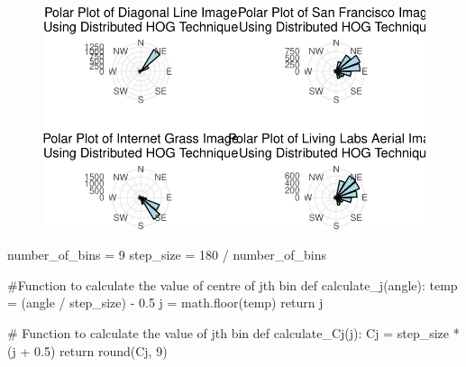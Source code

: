 \documentclass[
  letterpaper,
  DIV=11,
  numbers=noendperiod]{scrreprt}
\newenvironment{Shaded}{\begin{snugshade}}{\end{snugshade}}
\newcommand{\BuiltInTok}[1]{\textcolor[rgb]{0.00,0.23,0.31}{#1}}
\newcommand{\CommentTok}[1]{\textcolor[rgb]{0.37,0.37,0.37}{#1}}
\newcommand{\ControlFlowTok}[1]{\textcolor[rgb]{0.00,0.23,0.31}{#1}}
\newcommand{\DecValTok}[1]{\textcolor[rgb]{0.68,0.00,0.00}{#1}}
\newcommand{\FloatTok}[1]{\textcolor[rgb]{0.68,0.00,0.00}{#1}}
\newcommand{\KeywordTok}[1]{\textcolor[rgb]{0.00,0.23,0.31}{#1}}
\newcommand{\NormalTok}[1]{\textcolor[rgb]{0.00,0.23,0.31}{#1}}
\newcommand{\OperatorTok}[1]{\textcolor[rgb]{0.37,0.37,0.37}{#1}}
\begin{document}
\begin{figure}[H]

{\centering \includegraphics{results_files/figure-pdf/unnamed-chunk-23-1.pdf}

}

\end{figure}

\begin{Shaded}
\begin{Highlighting}[]
\NormalTok{number\_of\_bins }\OperatorTok{=} \DecValTok{9}
\NormalTok{step\_size }\OperatorTok{=} \DecValTok{180} \OperatorTok{/}\NormalTok{ number\_of\_bins}
\end{Highlighting}
\end{Shaded}

\begin{Shaded}
\begin{Highlighting}[]
\CommentTok{\#Function to calculate the value of centre of jth bin}
\KeywordTok{def}\NormalTok{ calculate\_j(angle):}
\NormalTok{  temp }\OperatorTok{=}\NormalTok{ (angle }\OperatorTok{/}\NormalTok{ step\_size) }\OperatorTok{{-}} \FloatTok{0.5}
\NormalTok{  j }\OperatorTok{=}\NormalTok{ math.floor(temp)}
  \ControlFlowTok{return}\NormalTok{ j}
\end{Highlighting}
\end{Shaded}

\begin{Shaded}
\begin{Highlighting}[]
\CommentTok{\# Function to calculate the value of jth bin}
\KeywordTok{def}\NormalTok{ calculate\_Cj(j):}
\NormalTok{  Cj }\OperatorTok{=}\NormalTok{ step\_size }\OperatorTok{*}\NormalTok{ (j }\OperatorTok{+} \FloatTok{0.5}\NormalTok{)}
  \ControlFlowTok{return} \BuiltInTok{round}\NormalTok{(Cj, }\DecValTok{9}\NormalTok{)}
\end{Highlighting}
\end{Shaded}
\end{document}
